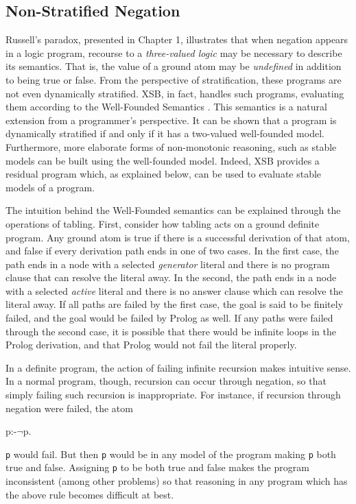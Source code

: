 \subsection{Non-Stratified Negation}

Russell's paradox, presented in Chapter 1, illustrates that when
negation appears in a logic program, recourse to a {\em three-valued
logic} may be necessary to describe its semantics.  That is, the value
of a ground atom may be {\em undefined} in addition to being true or
false.  From the perspective of stratification, these programs are not
even dynamically stratified.  XSB, in fact, handles such programs,
evaluating them according to the Well-Founded Semantics \cite{VGRS91}.
This semantics is a natural extension from a programmer's perspective.
It can be shown that a program is dynamically stratified if and only
if it has a two-valued well-founded model.  Furthermore, more
elaborate forms of non-monotonic reasoning, such as stable models
\cite{GeLi88} can be built using the well-founded model.  Indeed, XSB
provides a residual program which, as explained below, can be used to
evaluate stable models of a program.

The intuition behind the Well-Founded semantics can be explained
through the operations of tabling.  First, consider how tabling acts
on a ground definite program.  Any ground atom is true if there is a
successful derivation of that atom, and false if every derivation path
ends in one of two cases.  In the first case, the path ends in a node
with a selected {\em generator} literal and there is no program clause
that can resolve the literal away.  In the second, the path ends in a
node with a selected {\em active} literal and there is no answer
clause which can resolve the literal away.  If all paths are failed by
the first case, the goal is said to be finitely failed, and the goal
would be failed by Prolog as well.  If any paths were failed through
the second case, it is possible that there would be infinite loops in
the Prolog derivation, and that Prolog would not fail the literal
properly.

In a definite program, the action of failing infinite recursion makes
intuitive sense.  In a normal program, though, recursion can occur
through negation, so that simply failing such recursion is
inappropriate.  For instance, if recursion through negation were
failed, the atom
\begin{Prog}
p:-$\neg$p.
\end{Prog}
{\tt p} would fail.  But then {\tt p} would be in any model of the
program making {\tt p} both true and false.  Assigning {\tt p} to be
both true and false makes the program inconsistent (among other
problems) so that reasoning in any program which has the above rule
becomes difficult at best.

